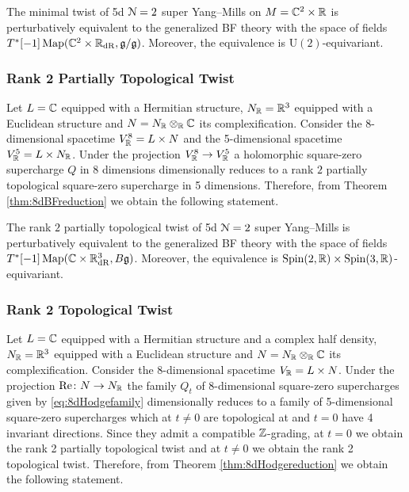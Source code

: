 \documentclass[10pt, oneside]{article}
\renewcommand{\Re}{\mathrm{Re}}
\renewcommand{\U}{\mathrm{U}}
\begin{document}
\begin{theorem}
The minimal twist of 5d $\mathcal N=2$ super Yang--Mills on $M=\mathbb C^2\times \mathbb R$ is perturbatively equivalent to the generalized BF theory with the space of fields $T^*[-1]\operatorname{Map}(\mathbb C^2\times \mathbb R_{\mathrm{dR}}, \mathfrak g/\mathfrak g)$. Moreover, the equivalence is $\U(2)$-equivariant.
\end{theorem}

\subsubsection{Rank 2 Partially Topological Twist}
\label{sect:5dpartialtwist}

Let $L = \mathbb C$ equipped with a Hermitian structure, $N_\mathbb R=\mathbb R^3$ equipped with a Euclidean structure and $N=N_\mathbb R\otimes_\mathbb R\mathbb C$ its complexification. Consider the 8-dimensional spacetime $V^8_\mathbb R=L\times N$ and the 5-dimensional spacetime $V^5_\mathbb R=L\times N_\mathbb R$. Under the projection $V^8_\mathbb R\rightarrow V^5_\mathbb R$ a holomorphic square-zero supercharge $Q$ in 8 dimensions dimensionally reduces to a rank $2$ partially topological square-zero supercharge in 5 dimensions. Therefore, from Theorem \ref{thm:8dBFreduction} we obtain the following statement.

\begin{theorem}
The rank $2$ partially topological twist of 5d $\mathcal N=2$ super Yang--Mills is perturbatively equivalent to the generalized BF theory with the space of fields $T^*[-1]\operatorname{Map}(\mathbb C\times \mathbb R^3_{\mathrm{dR}}, B\mathfrak g)$. Moreover, the equivalence is $\mathrm{Spin}(2, \mathbb R)\times\mathrm{Spin}(3, \mathbb R)$-equivariant.
\end{theorem}

\subsubsection{Rank 2 Topological Twist}
\label{sect:5drank2topologicaltwist}

Let $L=\mathbb C$ equipped with a Hermitian structure and a complex half density, $N_\mathbb R=\mathbb R^3$ equipped with a Euclidean structure and $N=N_\mathbb R\otimes_\mathbb R\mathbb C$ its complexification. Consider the 8-dimensional spacetime $V_\mathbb R=L\times N$. Under the projection $\Re\colon N\rightarrow N_\RR$ the family $Q_t$ of 8-dimensional square-zero supercharges given by \eqref{eq:8dHodgefamily} dimensionally reduces to a family of 5-dimensional square-zero supercharges which at $t\neq 0$ are topological at and $t=0$ have 4 invariant directions. Since they admit a compatible $\mathbb Z$-grading, at $t=0$ we obtain the rank 2 partially topological twist and at $t\neq 0$ we obtain the rank 2 topological twist. Therefore, from Theorem \ref{thm:8dHodgereduction} we obtain the following statement.
\end{document}
